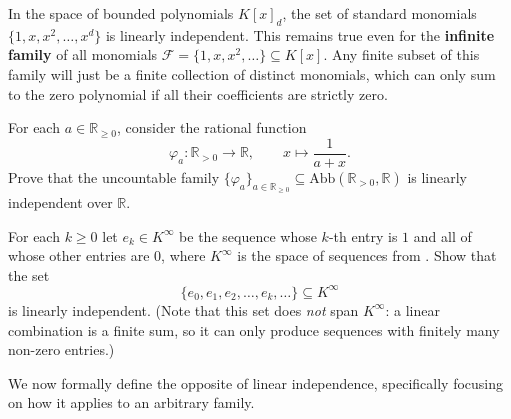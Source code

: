 \begin{example}
\label{ex:monomials_independent}
In the space of bounded polynomials $K[x]_d$, the set of standard monomials $\{1, x, x^2, \dots, x^d\}$ is linearly independent. This remains true even for the \textbf{infinite family} of all monomials $\mathcal{F} = \{1, x, x^2, \dots\} \subseteq K[x]$. Any finite subset of this family will just be a finite collection of distinct monomials, which can only sum to the zero polynomial if all their coefficients are strictly zero.
\end{example}

\begin{exercise}
\label{exc:rational_functions_independent}
For each $a \in \mathbb{R}_{\ge 0}$, consider the rational function
\[
\varphi_a \colon \mathbb{R}_{>0} \longrightarrow \mathbb{R}, \qquad x \longmapsto \frac{1}{a + x}.
\]
Prove that the uncountable family $\{\varphi_a\}_{a \in \mathbb{R}_{\ge 0}} \subseteq \mathrm{Abb}(\mathbb{R}_{>0}, \mathbb{R})$ is linearly independent over $\mathbb{R}$.
\end{exercise}

\begin{exercise}
\label{exc:k_infinity_independent}
For each $k \ge 0$ let $e_k \in K^\infty$ be the sequence whose $k$-th entry is $1$ and all of whose other entries are $0$, where $K^\infty$ is the space of sequences from . Show that the set
\[
\{e_0, e_1, e_2, \dots, e_k, \dots\} \subseteq K^\infty
\]
is linearly independent. (Note that this set does \emph{not} span $K^\infty$: a linear combination is a finite sum, so it can only produce sequences with finitely many non-zero entries.)
\end{exercise}

We now formally define the opposite of linear independence, specifically focusing on how it applies to an arbitrary family.

